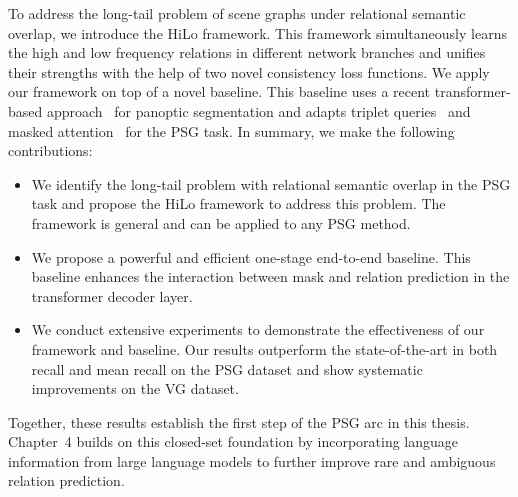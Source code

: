 To address the long-tail problem of scene graphs under relational semantic overlap, we introduce the HiLo framework. This framework simultaneously learns the high and low frequency relations in different network branches and unifies their strengths with the help of two novel consistency loss functions.
%
We apply our framework on top of a novel baseline. This baseline uses a recent transformer-based approach~\citep{cheng2022masked} for panoptic segmentation and adapts triplet queries~\citep{yang2022panoptic} and masked attention~\citep{cheng2022masked} for the PSG task.
%
In summary, we make the following contributions:
\begin{itemize}
    \item We identify the long-tail problem with relational semantic overlap in the PSG task and propose the HiLo framework to address this problem. The framework is general and can be applied to any PSG method.

    \item We propose a powerful and efficient one-stage end-to-end baseline. This baseline enhances the interaction between mask and relation prediction in the transformer decoder layer.

    \item We conduct extensive experiments to demonstrate the effectiveness of our framework and baseline.
    Our results outperform the state-of-the-art in both recall and mean recall on the PSG dataset and show systematic improvements on the VG dataset.
\end{itemize}

Together, these results establish the first step of the PSG arc in this thesis.
Chapter~4 builds on this closed-set foundation by incorporating language information from large language models to further improve rare and ambiguous relation prediction.
